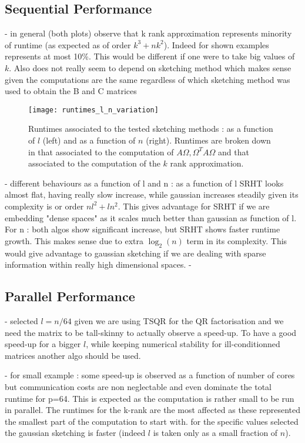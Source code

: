 \documentclass[a4paper, 12pt,oneside]{article}
\begin{document}
        \subsection{Sequential Performance}
		- in general (both plots) observe that k rank approximation represents minority of runtime (as expected as of order $k^3 +nk^2$). Indeed for shown examples represents at most 10\%. This would be different if one were to take big values of $k$. Also does not really seem to depend on sketching method which makes sense given the computations are the same regardless of which sketching method was used to obtain the B and C matrices
		\begin{figure}[htb]       
			\centering             
				\vspace{0em}
				\texttt{[image: runtimes\_l\_n\_variation]}
				\caption{Runtimes associated to the tested sketching methods : as a function of $l$ (left) and as a function of $n$ (right). Runtimes are broken down in that associated to the computation of $A\Omega,\Omega^T A\Omega$ and that associated to the computation of the $k$ rank approximation.}
				\label{fig:runtimes-l-n-variation}
		\end{figure}

		- different behaviours as a function of l and n : as a function of l SRHT looks almost flat, having really slow increase, while gaussian increases steadily given its complexity is or order $nl^2 + ln^2$. This gives advantage for SRHT if we are embedding "dense spaces" as it scales much better than gaussian as function of l. For n : both algos show significant increase, but SRHT shows faster runtime growth. This makes sense due to extra $\log_2(n)$ term in its complexity. This would give advantage to gaussian sketching if we are dealing with sparse information within really high dimensional spaces.
		- 
        \subsection{Parallel Performance}
		- selected $l=n/64$ given we are using TSQR for the QR factorisation and we need the matrix to be tall-skinny to actually observe a speed-up. To have a good speed-up for a bigger $l$, while keeping numerical stability for ill-conditionned matrices another algo should be used.

		- for small example : some speed-up is observed as a function of number of cores but communication costs are non neglectable and even dominate the total runtime for p=64. This is expected as the computation is rather small to be run in parallel. The runtimes for the k-rank are the most affected as these represented the smallest part of the computation to start with. for the specific values selected the gaussian sketching is faster (indeed $l$ is taken only as a small fraction of $n$).
\end{document}
